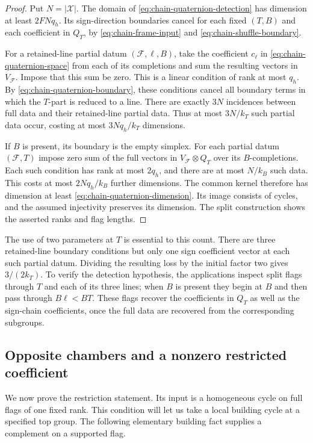 \begin{proof}
Put $N=|\mathcal X|$. The domain of
\eqref{eq:chain-quaternion-detection} has dimension at least
$2FNq_h$. Its sign-direction boundaries cancel for each fixed
$(T,B)$ and each coefficient in $Q_T$, by
\eqref{eq:chain-frame-input} and
\eqref{eq:chain-shuffle-boundary}.

For a retained-line partial datum $(\mathcal F,\ell,B)$, take
the coefficient $c_\ell$ in \eqref{eq:chain-quaternion-space}
from each of its completions and sum the resulting vectors in
$V_{\mathcal F}$. Impose that this sum be zero. This is a
linear condition of rank at most $q_h$. By
\eqref{eq:chain-quaternion-boundary}, these conditions cancel
all boundary terms in which the $T$-part is reduced to a line.
There are exactly $3N$ incidences between full data and their
retained-line partial data. Thus at most $3N/k_T$ such partial
data occur, costing at most $3Nq_h/k_T$ dimensions.

If $B$ is present, its boundary is the empty simplex. For each
partial datum $(\mathcal F,T)$ impose zero sum of the full
vectors in $V_{\mathcal F}\otimes Q_T$ over its $B$-completions.
Each such condition has rank at most $2q_h$, and there are at
most $N/k_B$ such data. This costs at most $2Nq_h/k_B$ further
dimensions. The common kernel therefore has dimension at least
\eqref{eq:chain-quaternion-dimension}. Its image consists of
cycles, and the assumed injectivity preserves its dimension.
The split construction shows the asserted ranks and flag lengths.
\end{proof}

The use of two parameters at $T$ is essential to this count.
There are three retained-line boundary conditions but only one
sign coefficient vector at each such partial datum. Dividing
the resulting loss by the initial factor two gives
$3/(2k_T)$. To verify the detection hypothesis, the applications
inspect split flags through $T$ and each of its three lines;
when $B$ is present they begin at $B$ and then pass through
$B\ell<BT$. These flags recover the coefficients in $Q_T$
as well as the sign-chain coefficients, once the full data
are recovered from the corresponding subgroups.

\subsection{Opposite chambers and a nonzero restricted coefficient}

We now prove the restriction statement. Its input is a homogeneous
cycle on full flags of one fixed rank. This condition will let us
take a local building cycle at a specified top group. The following
elementary building fact supplies a complement on a supported flag.

